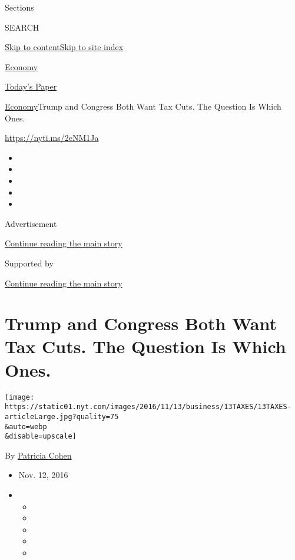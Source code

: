 Sections

SEARCH

\protect\hyperlink{site-content}{Skip to
content}\protect\hyperlink{site-index}{Skip to site index}

\href{https://www.nytimes.com/section/business/economy}{Economy}

\href{https://myaccount.nytimes.com/auth/login?response_type=cookie\&client_id=vi}{}

\href{https://www.nytimes.com/section/todayspaper}{Today's Paper}

\href{/section/business/economy}{Economy}\textbar{}Trump and Congress
Both Want Tax Cuts. The Question Is Which Ones.

\url{https://nyti.ms/2eNM1Ja}

\begin{itemize}
\item
\item
\item
\item
\item
\end{itemize}

Advertisement

\protect\hyperlink{after-top}{Continue reading the main story}

Supported by

\protect\hyperlink{after-sponsor}{Continue reading the main story}

\hypertarget{trump-and-congress-both-want-tax-cuts-the-question-is-which-ones}{%
\section{Trump and Congress Both Want Tax Cuts. The Question Is Which
Ones.}\label{trump-and-congress-both-want-tax-cuts-the-question-is-which-ones}}

\texttt{[image: https://static01.nyt.com/images/2016/11/13/business/13TAXES/13TAXES-articleLarge.jpg?quality=75\\\&auto=webp\\\&disable=upscale]}

By \href{http://www.nytimes.com/by/patricia-cohen}{Patricia Cohen}

\begin{itemize}
\item
  Nov. 12, 2016
\item
  \begin{itemize}
  \item
  \item
  \item
  \item
  \item
  \end{itemize}
\end{itemize}

